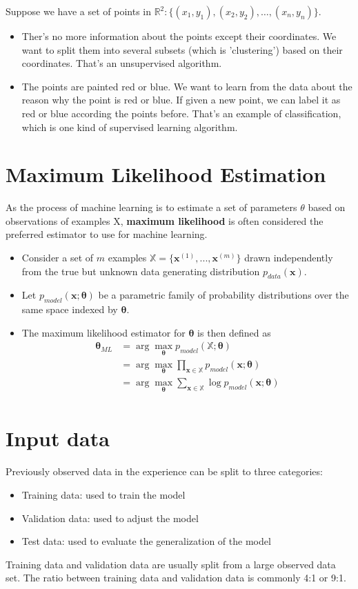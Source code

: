 	 Suppose we have a set of points in $\mathbb{R}^2: \{(x_1,y_1),(x_2,y_2),\dots,(x_n,y_n)\}$.
	 \begin{itemize}
	 	\item Ther's no more information about the points except their coordinates. We want to split them into several subsets (which is 'clustering') based on their coordinates. That's an unsupervised algorithm.
	 	\item The points are painted red or blue. We want to learn from the data about the reason why the point is red or blue. If given a new point, we can label it as red or blue according the points before. That's an example of classification, which is one kind of supervised learning algorithm.
	 \end{itemize}
	\section{Maximum Likelihood Estimation}
	As the process of machine learning is to estimate a set of parameters $\theta$ based on observations of examples X, \textbf{maximum likelihood} is often considered the preferred estimator to use for machine learning.
	
	\begin{itemize}
		\item Consider a set of $m$ examples $\mathbb X=\{\bm x^{(1)},...,\bm x^{(m)}\}$ drawn independently from the true but unknown data generating distribution $p_{data}(\bm x)$.
		\item Let $p_{model}(\bm x;\bm \theta)$ be a parametric family of probability distributions over the same space indexed by $\bm \theta$.
		\item The maximum likelihood estimator for $\bm \theta$ is then defined as
		\begin{equation*}
		\begin{split}
		\bm \theta_{ML} &= \arg \max_{\bm \theta}p_{model}(\mathbb X;\bm \theta) \\
		&=\arg \max_{\bm \theta}\prod_{\bm x \in \mathbb X} p_{model}(\bm x;\bm \theta)\\
		&=\arg \max_{\bm \theta}\sum_{\bm x \in \mathbb X} \log p_{model}(\bm x;\bm \theta)\\
		\end{split}
		\end{equation*}
	\end{itemize}

	\section{Input data}
	Previously observed data in the experience can be split to three categories:
	\begin{itemize}
		\item Training data: used to train the model
		\item Validation data: used to adjust the model
		\item Test data: used to evaluate the generalization of the model
	\end{itemize}
	Training data and validation data are usually split from a large observed data set. The ratio between training data and validation data is commonly 4:1 or 9:1.
